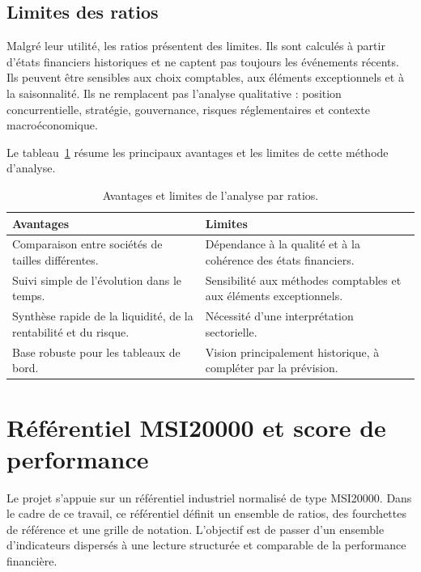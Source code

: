 \subsection{Limites des ratios}
\par Malgré leur utilité, les ratios présentent des limites. Ils sont calculés à
partir d'états financiers historiques et ne captent pas toujours les événements
récents. Ils peuvent être sensibles aux choix comptables, aux éléments
exceptionnels et à la saisonnalité. Ils ne remplacent pas l'analyse qualitative :
position concurrentielle, stratégie, gouvernance, risques réglementaires et
contexte macroéconomique.

\par Le tableau~\ref{tab:limitesratios} résume les principaux avantages et les
limites de cette méthode d'analyse.

\begin{table}[H]
\centering
\caption[Avantages et limites des ratios]{Avantages et limites de l'analyse par ratios.}
\label{tab:limitesratios}
\begin{tabularx}{\linewidth}{|X|X|}
\hline
\textbf{Avantages} & \textbf{Limites} \\ \hline
Comparaison entre sociétés de tailles différentes. & Dépendance à la qualité et à la cohérence des états financiers. \\ \hline
Suivi simple de l'évolution dans le temps. & Sensibilité aux méthodes comptables et aux éléments exceptionnels. \\ \hline
Synthèse rapide de la liquidité, de la rentabilité et du risque. & Nécessité d'une interprétation sectorielle. \\ \hline
Base robuste pour les tableaux de bord. & Vision principalement historique, à compléter par la prévision. \\ \hline
\end{tabularx}
\end{table}

\section{Référentiel MSI20000 et score de performance}
\label{sec:msi}
\par Le projet s'appuie sur un référentiel industriel normalisé de type
MSI20000. Dans le cadre de ce travail, ce référentiel définit un ensemble de
ratios, des fourchettes de référence et une grille de notation. L'objectif est
de passer d'un ensemble d'indicateurs dispersés à une lecture structurée et
comparable de la performance financière.

